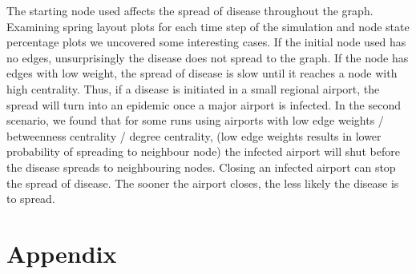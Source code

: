 \documentclass[a4paper,11pt]{article}
\begin{document}
The starting node used affects the spread of disease throughout the graph. Examining spring layout plots for each time step of the simulation and node state percentage plots we uncovered some interesting cases. If the initial node used has no edges, unsurprisingly the disease does not spread to the graph. If the node has edges with low weight, the spread of disease is slow until it reaches a node with high centrality. Thus, if a disease is initiated in a small regional airport, the spread will turn into an epidemic once a major airport is infected.  In the second scenario, we found that for some runs using airports with low edge weights / betweenness centrality / degree centrality, (low edge weights results in lower probability of spreading to neighbour node) the infected airport will shut before the disease spreads to neighbouring nodes. Closing an infected airport can stop the spread of disease. The sooner the airport closes, the less likely the disease is to spread.


\section{Appendix}










\end{document}
